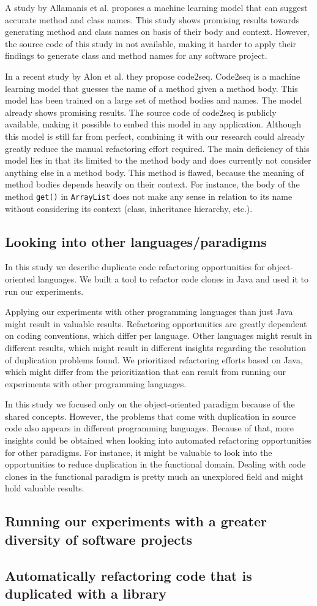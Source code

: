 A study by Allamanis et al. \cite{allamanis2015suggesting} proposes a machine learning model that can suggest accurate method and class names. This study shows promising results towards generating method and class names on basis of their body and context. However, the source code of this study in not available, making it harder to apply their findings to generate class and method names for any software project.

In a recent study by Alon et al. \cite{alon2018code2seq} they propose code2seq. Code2seq is a machine learning model that guesses the name of a method given a method body. This model has been trained on a large set of method bodies and names. The model already shows promising results. The source code of code2seq is publicly available, making it possible to embed this model in any application. Although this model is still far from perfect, combining it with our research could already greatly reduce the manual refactoring effort required. The main deficiency of this model lies in that its limited to the method body and does currently not consider anything else in a method body. This method is flawed, because the meaning of method bodies depends heavily on their context. For instance, the body of the method \texttt{get()} in \texttt{ArrayList} does not make any sense in relation to its name without considering its context (class, inheritance hierarchy, etc.).

\subsection{Looking into other languages/paradigms}
In this study we describe duplicate code refactoring opportunities for object-oriented languages. We built a tool to refactor code clones in Java and used it to run our experiments.

Applying our experiments with other programming languages than just Java might result in valuable results. Refactoring opportunities are greatly dependent on coding conventions, which differ per language. Other languages might result in different results, which might result in different insights regarding the resolution of duplication problems found. We prioritized refactoring efforts based on Java, which might differ from the prioritization that can result from running our experiments with other programming languages.

In this study we focused only on the object-oriented paradigm because of the shared concepts. However, the problems that come with duplication in source code also appears in different programming languages. Because of that, more insights could be obtained when looking into automated refactoring opportunities for other paradigms. For instance, it might be valuable to look into the opportunities to reduce duplication in the functional domain. Dealing with code clones in the functional paradigm is pretty much an unexplored field and might hold valuable results.

\subsection{Running our experiments with a greater diversity of software projects}

\subsection{Automatically refactoring code that is duplicated with a library}
